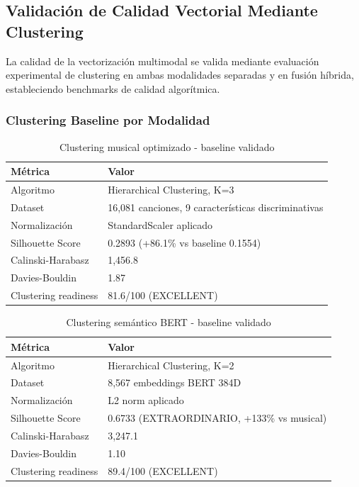 \documentclass[12pt,a4paper]{article}
\begin{document}
\subsection{Validación de Calidad Vectorial Mediante Clustering}

La calidad de la vectorización multimodal se valida mediante evaluación experimental de clustering en ambas modalidades separadas y en fusión híbrida, estableciendo benchmarks de calidad algorítmica.

\subsubsection{Clustering Baseline por Modalidad}

\begin{table}[h]
\centering
\caption{Clustering musical optimizado - baseline validado}
\begin{tabular}{@{}ll@{}}
\toprule
\textbf{Métrica} & \textbf{Valor} \\
\midrule
Algoritmo & Hierarchical Clustering, K=3 \\
Dataset & 16,081 canciones, 9 características discriminativas \\
Normalización & StandardScaler aplicado \\
Silhouette Score & 0.2893 (+86.1\% vs baseline 0.1554) \\
Calinski-Harabasz & 1,456.8 \\
Davies-Bouldin & 1.87 \\
Clustering readiness & 81.6/100 (EXCELLENT) \\
\bottomrule
\end{tabular}
\end{table}

\begin{table}[h]
\centering
\caption{Clustering semántico BERT - baseline validado}
\begin{tabular}{@{}ll@{}}
\toprule
\textbf{Métrica} & \textbf{Valor} \\
\midrule
Algoritmo & Hierarchical Clustering, K=2 \\
Dataset & 8,567 embeddings BERT 384D \\
Normalización & L2 norm aplicado \\
Silhouette Score & 0.6733 (EXTRAORDINARIO, +133\% vs musical) \\
Calinski-Harabasz & 3,247.1 \\
Davies-Bouldin & 1.10 \\
Clustering readiness & 89.4/100 (EXCELLENT) \\
\bottomrule
\end{tabular}
\end{table}
\end{document}
